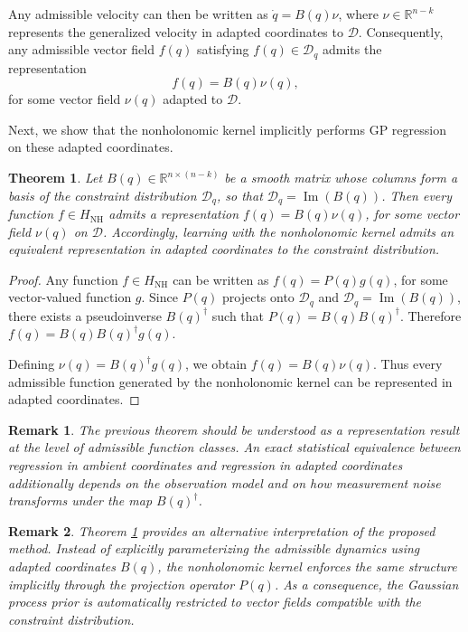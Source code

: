 \documentclass[letterpaper, 10 pt, conference]{ieeeconf}
\newtheorem{theorem}{Theorem}
\newtheorem{remark}{Remark}
\newcommand{\D}{\mathcal{D}}
\begin{document}
Any admissible velocity can then be written as $\dot q = B(q)\nu$, where $\nu\in\mathbb R^{n-k}$ represents the generalized velocity in adapted coordinates to $\D$. Consequently, any admissible vector field $f(q)$ satisfying $f(q)\in\mathcal D_q$ admits the representation
\begin{equation}
f(q)=B(q)\nu(q),
\end{equation}
for some vector field $\nu(q)$ adapted to $\D$.

Next, we show that the nonholonomic kernel implicitly performs GP regression on these adapted coordinates.



\begin{theorem}\label{th1}
Let $B(q)\in\mathbb{R}^{n\times(n-k)}$ be a smooth matrix whose columns form a basis of the constraint distribution $\D_q$, so that $\mathcal{D}_q=\operatorname{Im}(B(q))$. Then every function $f\in H_{\mathrm{NH}}$ admits a representation
$f(q)=B(q)\nu(q)$, for some vector field $\nu(q)$ on $\D$. Accordingly, learning with the nonholonomic kernel admits an equivalent representation in adapted coordinates to the constraint distribution.
\end{theorem}
\begin{proof}
Any function $f\in H_{\mathrm{NH}}$ can be written as $f(q)=P(q)g(q)$, for some vector-valued function $g$. Since $P(q)$ projects onto $\D_q$ and $\D_q=\operatorname{Im}(B(q))$, there exists a pseudoinverse $B(q)^\dagger$ such that $P(q)=B(q)B(q)^\dagger$. Therefore $f(q)=B(q)B(q)^\dagger g(q)$.

Defining $\nu(q)=B(q)^\dagger g(q)$, we obtain $f(q)=B(q)\nu(q)$. Thus every admissible function generated by the nonholonomic kernel can be represented in adapted coordinates.
\end{proof}


\begin{remark}
The previous theorem should be understood as a representation result at the level of admissible function classes. An exact statistical equivalence between regression in ambient coordinates and regression in adapted coordinates additionally depends on the observation model and on how measurement noise transforms under the map $B(q)^\dagger$.\end{remark}



\begin{remark}Theorem \ref{th1} provides an alternative interpretation of the proposed method. Instead of explicitly parameterizing the admissible dynamics using adapted coordinates $B(q)$, the nonholonomic kernel enforces the same structure implicitly through the projection operator $P(q)$. As a consequence, the Gaussian process prior is automatically restricted to vector fields compatible with the constraint distribution.\end{remark}
\end{document}
